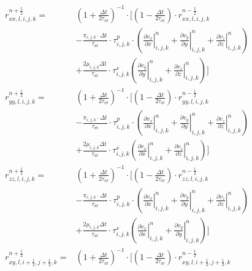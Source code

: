 \documentclass[pdftex,a4paper,parskip,listof=totoc,bibliography=totoc,onehalfspacing,12pt]{scrreprt}
\begin{document}
\begin{align*}
	r_{xx,l,i,j,k}^{n+\frac{1}{2}} =& \left( 1+ \frac{\Delta t}{2\tau_{\sigma l}} \right)^{-1}\cdot \Bigg[\left( 1- \frac{\Delta t}{2\tau_{\sigma l}}  \right) \cdot r_{xx,l,i,j,k}^{n-\frac{1}{2}} \\ 
	& -\frac{\pi_{i,j,k}\cdot\Delta t}{\tau_{\sigma l}}\cdot \tau^p_{i,j,k} \cdot \left( \left.\frac{\partial v_x}{\partial x}\right\rvert_{i,j,k}^{n} + \left.\frac{\partial v_y}{\partial y}\right\rvert_{i,j,k}^{n} + \left.\frac{\partial v_z}{\partial z}\right\rvert_{i,j,k}^{n} \right)\\
	& + \frac{2\mu_{i,j,k} \Delta t}{\tau_{\sigma l}}\cdot \tau^s_{i,j,k} \left( \left.\frac{\partial v_y}{\partial y}\right\rvert_{i,j,k}^{n} + \left.\frac{\partial v_z}{\partial z}\right\rvert_{i,j,k}^{n}  \right)\Bigg] \\
	r_{yy,l,i,j,k}^{n+\frac{1}{2}} =& \left( 1+ \frac{\Delta t}{2\tau_{\sigma l}} \right)^{-1}\cdot \Bigg[\left( 1- \frac{\Delta t}{2\tau_{\sigma l}}  \right) \cdot r_{yy,l,i,j,k}^{n-\frac{1}{2}} \\ 
	& -\frac{\pi_{i,j,k}\cdot\Delta t}{\tau_{\sigma l}}\cdot \tau^p_{i,j,k} \cdot \left( \left.\frac{\partial v_x}{\partial x}\right\rvert_{i,j,k}^{n} + \left.\frac{\partial v_y}{\partial y}\right\rvert_{i,j,k}^{n} + \left.\frac{\partial v_z}{\partial z}\right\rvert_{i,j,k}^{n} \right)\\
	& + \frac{2\mu_{i,j,k} \Delta t}{\tau_{\sigma l}}\cdot \tau^s_{i,j,k} \left( \left.\frac{\partial v_x}{\partial x}\right\rvert_{i,j,k}^{n} + \left.\frac{\partial v_z}{\partial z}\right\rvert_{i,j,k}^{n}  \right)\Bigg] \\
	r_{zz,l,i,j,k}^{n+\frac{1}{2}} =& \left( 1+ \frac{\Delta t}{2\tau_{\sigma l}} \right)^{-1}\cdot \Bigg[\left( 1- \frac{\Delta t}{2\tau_{\sigma l}}  \right) \cdot r_{zz,l,i,j,k}^{n-\frac{1}{2}} \\ 
	& -\frac{\pi_{i,j,k}\cdot\Delta t}{\tau_{\sigma l}}\cdot \tau^p_{i,j,k} \cdot \left( \left.\frac{\partial v_x}{\partial x}\right\rvert_{i,j,k}^{n} + \left.\frac{\partial v_y}{\partial y}\right\rvert_{i,j,k}^{n} + \left.\frac{\partial v_z}{\partial z}\right\rvert_{i,j,k}^{n} \right)\\
	& + \frac{2\mu_{i,j,k} \Delta t}{\tau_{\sigma l}}\cdot \tau^s_{i,j,k} \left( \left.\frac{\partial v_x}{\partial x}\right\rvert_{i,j,k}^{n} + \left.\frac{\partial v_y}{\partial y}\right\rvert_{i,j,k}^{n}  \right)\Bigg] \\
	r_{xy,l,i+\frac{1}{2},j+\frac{1}{2},k}^{n+\frac{1}{2}} =& \left( 1+ \frac{\Delta t}{2\tau_{\sigma l}} \right)^{-1}\cdot \Bigg[\left( 1- \frac{\Delta t}{2\tau_{\sigma l}}  \right) \cdot r_{xy,l,i+\frac{1}{2},j+\frac{1}{2},k}^{n-\frac{1}{2}} \\ 

\end{align*}
\end{document}

